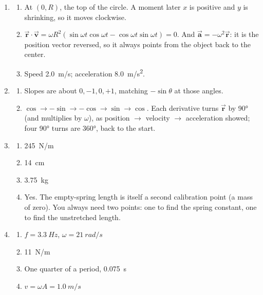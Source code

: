 \documentclass{handout}
\begin{document}
{\begin{enumerate}
\begin{enumerate}
    \end{enumerate}
    \item \begin{enumerate}
        \item At $(0, R)$, the top of the circle. A moment later $x$ is positive and $y$ is shrinking, so it moves clockwise.
        \item $\vec{\boldsymbol{r}}\cdot\vec{\boldsymbol{v}} = \omega R^2(\sin\omega t\cos\omega t - \cos\omega t\sin\omega t) = 0$. And $\vec{\boldsymbol{a}} = -\omega^2\vec{\boldsymbol{r}}$: it is the position vector reversed, so it always points from the object back to the center.
        \item Speed \SI{2.0}{m/s}; acceleration \SI{8.0}{m/s^2}.
    \end{enumerate}
    \item \begin{enumerate}
        \item Slopes are about $0, -1, 0, +1$, matching $-\sin\theta$ at those angles.
        \item $\cos \to -\sin \to -\cos \to \sin \to \cos$. Each derivative turns $\vec{\boldsymbol{r}}$ by \ang{90} (and multiplies by $\omega$), as position $\to$ velocity $\to$ acceleration showed; four \ang{90} turns are \ang{360}, back to the start.
    \end{enumerate}
    \item \begin{enumerate}
        \item \SI{245}{N/m}
        \item \SI{14}{cm}
        \item \SI{3.75}{kg}
        \item Yes. The empty-spring length is itself a second calibration point (a mass of zero). You always need two points: one to find the spring constant, one to find the unstretched length.
    \end{enumerate}
    \item \begin{enumerate}
        \item $f = \SI{3.3}{Hz}$, $\omega = \SI{21}{rad/s}$
        \item \SI{11}{N/m}
        \item One quarter of a period, \SI{0.075}{s}
        \item $v = \omega A = \SI{1.0}{m/s}$
    \end{enumerate}
\end{enumerate}
}
\end{document}
